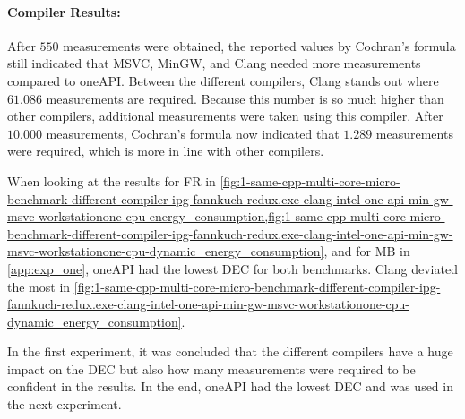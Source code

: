 

\paragraph{Compiler Results:} After $550$ measurements were obtained, the reported values by Cochran's formula still indicated that MSVC, MinGW, and Clang needed more measurements compared to oneAPI. Between the different compilers, Clang stands out where $61.086$ measurements are required. Because this number is so much higher than other compilers, additional measurements were taken using this compiler. After $10.000$ measurements, Cochran's formula now indicated that $1.289$ measurements were required, which is more in line with other compilers.


When looking at the results for FR in \cref{fig:1-same-cpp-multi-core-micro-benchmark-different-compiler-ipg-fannkuch-redux.exe-clang-intel-one-api-min-gw-msvc-workstationone-cpu-energy_consumption,fig:1-same-cpp-multi-core-micro-benchmark-different-compiler-ipg-fannkuch-redux.exe-clang-intel-one-api-min-gw-msvc-workstationone-cpu-dynamic_energy_consumption}, and for MB in \cref{app:exp_one}, oneAPI had the lowest DEC for both benchmarks. Clang deviated the most in \cref{fig:1-same-cpp-multi-core-micro-benchmark-different-compiler-ipg-fannkuch-redux.exe-clang-intel-one-api-min-gw-msvc-workstationone-cpu-dynamic_energy_consumption}.

In the first experiment, it was concluded that the different compilers have a huge impact on the DEC but also how many measurements were required to be confident in the results. In the end, oneAPI had the lowest DEC and was used in the next experiment.

